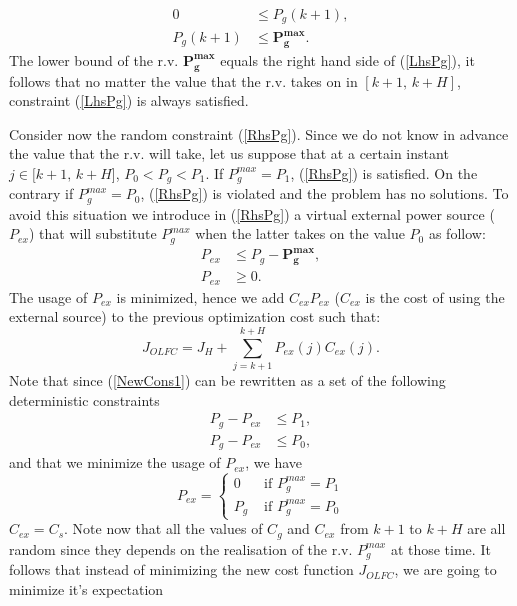 \documentclass[conference]{IEEEtran}
\begin{document}
\begin{subequations}
    \begin{align}
        0 &\leq P_g(k+1) \label{LhsPg}, \\
        P_g(k+1) &\leq \bm{P_g^{max}}. \label{RhsPg}
    \end{align}
\end{subequations}
The lower bound of the r.v. $\bm{P_g^{max}}$ equals the right hand side of (\ref{LhsPg}), it follows that no matter the value that the r.v. takes on in $[k+1,\, k+H]$, constraint  (\ref{LhsPg}) is always satisfied. 

Consider now the random constraint (\ref{RhsPg}). Since we do not know in advance the value that the r.v. will take,  let us suppose that at a certain instant $ j \in [k+1, \, k+H$], $P_0 < P_g < P_1$. If $P_g^{max} = P_1$, (\ref{RhsPg}) is satisfied. On the contrary if $P_g^{max} = P_0$, (\ref{RhsPg}) is violated and the problem has no solutions. To avoid this situation we introduce in (\ref{RhsPg}) a virtual external power source ($P_{ex}$) that will substitute $P_g^{max}$ when the latter takes on the value $P_0$ as follow: 
\begin{align}
     P_{ex} & \leq P_g - \bm{P_g^{max}}, \label{NewCons1}\\
     P_{ex} & \geq \label{NewCons2}0.
\end{align}
The usage of $P_{ex}$ is minimized, hence we add $C_{ex}P_{ex}$ ($C_{ex}$ is the cost of using the external source) to the previous optimization cost such that: 
\begin{equation}
    J_{OLFC} = J_H + \sum_{j=k+1}^{k+H} P_{ex}(j)C_{ex}(j).
\end{equation}
Note that since (\ref{NewCons1}) can be rewritten as a set of the following deterministic constraints 
 \begin{align}
 P_g - P_{ex} &\leq P_1 \label{NewCons3},\\
 P_g - P_{ex} & \leq P_0,
 \end{align}
 and that we minimize the usage of $P_{ex}$, we have 
 \begin{equation}
    P_{ex} = \left \{
        \begin{aligned}
            0 & \text{ if }  P_g^{max} = P_1 \\
            P_g &\text{ if } P_g^{max} = P_0
        \end{aligned}\right.
\end{equation}
$C_{ex} = C_s$. Note  now that all the values of $C_g$ and $C_{ex}$ from $k+1$ to $k+H$ are all random since they depends on the realisation of the r.v. $P_{g}^{max}$ at those time. It follows that instead of minimizing the new cost function $J_{OLFC}$, we are going to minimize it's expectation
\end{document}
